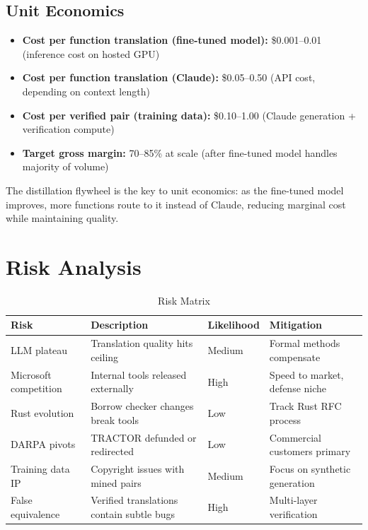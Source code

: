 \documentclass[11pt,a4paper]{article}
\theoremstyle{definition}
\theoremstyle{remark}
\begin{document}
\subsection{Unit Economics}

\begin{itemize}[leftmargin=2em]
\item \textbf{Cost per function translation (fine-tuned model):} \$0.001--0.01 (inference cost on hosted GPU)
\item \textbf{Cost per function translation (Claude):} \$0.05--0.50 (API cost, depending on context length)
\item \textbf{Cost per verified pair (training data):} \$0.10--1.00 (Claude generation + verification compute)
\item \textbf{Target gross margin:} 70--85\% at scale (after fine-tuned model handles majority of volume)
\end{itemize}

The distillation flywheel is the key to unit economics: as the fine-tuned model improves, more functions route to it instead of Claude, reducing marginal cost while maintaining quality.


\section{Risk Analysis}

\begin{table}[H]
\centering
\caption{Risk Matrix}
\begin{tabularx}{\textwidth}{lXll}
\toprule
\textbf{Risk} & \textbf{Description} & \textbf{Likelihood} & \textbf{Mitigation} \\
\midrule
LLM plateau & Translation quality hits ceiling & Medium & Formal methods compensate \\
Microsoft competition & Internal tools released externally & High & Speed to market, defense niche \\
Rust evolution & Borrow checker changes break tools & Low & Track Rust RFC process \\
DARPA pivots & TRACTOR defunded or redirected & Low & Commercial customers primary \\
Training data IP & Copyright issues with mined pairs & Medium & Focus on synthetic generation \\
False equivalence & Verified translations contain subtle bugs & High & Multi-layer verification \\
\bottomrule
\end{tabularx}
\end{table}
\end{document}
